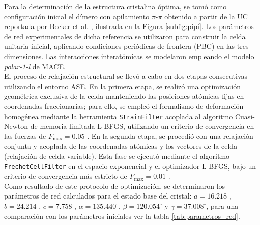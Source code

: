 \documentclass[12pt,letterpaper,oneside]{report}
\begin{document}
Para la determinación de la estructura cristalina óptima, se tomó como configuración inicial el dímero con apilamiento $\pi\text{-}\pi$ obtenido a partir de la UC reportada por Becker et al. \cite{becker2016bhematin}, ilustrada en la Figura \ref{subfig:pipi}. Los parámetros de red experimentales de dicha referencia se utilizaron para construir la celda unitaria inicial, aplicando condiciones periódicas de frontera (PBC) en las tres dimensiones. Las interacciones interatómicas se modelaron empleando el modelo \textit{polar-1-l} de MACE.\\

El proceso de relajación estructural se llevó a cabo en dos etapas consecutivas utilizando el entorno ASE. En la primera etapa, se realizó una optimización geométrica exclusiva de la celda manteniendo las posiciones atómicas fijas en coordenadas fraccionarias; para ello, se empleó el formalismo de deformación homogénea mediante la herramienta \texttt{StrainFilter} acoplada al algoritmo Cuasi-Newton de memoria limitada L-BFGS, utilizando un criterio de convergencia en las fuerzas de $F_{\text{max}} = 0.05$ . En la segunda etapa, se procedió con una relajación conjunta y acoplada de las coordenadas atómicas y los vectores de la celda (relajación de celda variable). Esta fase se ejecutó mediante el algoritmo \texttt{FrechetCellFilter} en el espacio exponencial y el optimizador L-BFGS, bajo un criterio de convergencia más estricto de $F_{\text{max}} = 0.01$ .\\

Como resultado de este protocolo de optimización, se determinaron los parámetros de red calculados para el estado base del cristal: $a = 16.218$ \text{\AA}, $b = 24.214$ \text{\AA}, $c = 7.758$ \text{\AA}, $\alpha = 135.440^\circ$, $\beta = 120.054^\circ$ y $\gamma = 37.008^\circ$, para una comparación con los parámetros iniciales ver la tabla \ref{tab:parametros_red}.\\
\end{document}
